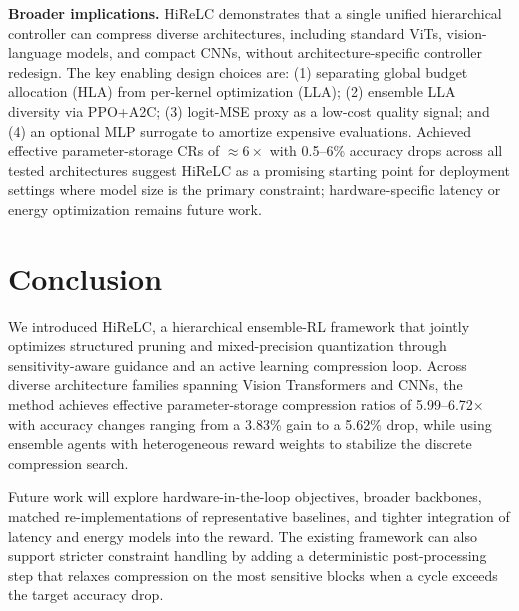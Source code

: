 \documentclass[preprint,12pt,authoryear]{elsarticle}
\begin{document}
\textbf{Broader implications.} HiReLC demonstrates that a single unified hierarchical controller can compress diverse architectures, including standard ViTs, vision-language models, and compact CNNs, without architecture-specific controller redesign. The key enabling design choices are: (1) separating global budget allocation (HLA) from per-kernel optimization (LLA); (2) ensemble LLA diversity via PPO+A2C; (3) logit-MSE proxy as a low-cost quality signal; and (4) an optional MLP surrogate to amortize expensive evaluations. Achieved effective parameter-storage CRs of $\approx6\times$ with 0.5--6\% accuracy drops across all tested architectures suggest HiReLC as a promising starting point for deployment settings where model size is the primary constraint; hardware-specific latency or energy optimization remains future work.

\section{Conclusion}
We introduced HiReLC, a hierarchical ensemble-RL framework that jointly optimizes
structured pruning and mixed-precision quantization through sensitivity-aware guidance
and an active learning compression loop. Across diverse architecture families spanning
Vision Transformers and CNNs, the method achieves effective parameter-storage compression
ratios of 5.99--6.72$\times$ with accuracy changes ranging from a 3.83\%
gain to a 5.62\% drop, while using ensemble agents with heterogeneous reward weights to
stabilize the discrete compression search.

Future work will explore hardware-in-the-loop objectives, broader backbones, matched
re-implementations of representative baselines, and tighter integration of latency and
energy models into the reward. The existing framework can also support stricter
constraint handling by adding a deterministic post-processing step that relaxes
compression on the most sensitive blocks when a cycle exceeds the target accuracy drop.



\newpage

\end{document}
